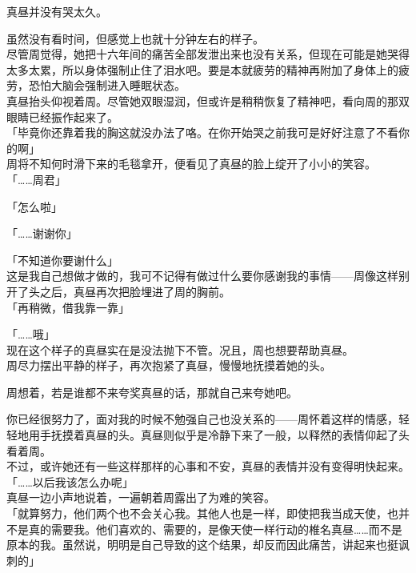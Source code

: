 真昼并没有哭太久。

虽然没有看时间，但感觉上也就十分钟左右的样子。\\

尽管周觉得，她把十六年间的痛苦全部发泄出来也没有关系，但现在可能是她哭得太多太累，所以身体强制止住了泪水吧。要是本就疲劳的精神再附加了身体上的疲劳，恐怕大脑会强制进入睡眠状态。\\

真昼抬头仰视着周。尽管她双眼湿润，但或许是稍稍恢复了精神吧，看向周的那双眼睛已经振作起来了。\\

「毕竟你还靠着我的胸这就没办法了咯。在你开始哭之前我可是好好注意了不看你的啊」\\

周将不知何时滑下来的毛毯拿开，便看见了真昼的脸上绽开了小小的笑容。\\

「……周君」

「怎么啦」

「……谢谢你」

「不知道你要谢什么」\\

这是我自己想做才做的，我可不记得有做过什么要你感谢我的事情——周像这样别开了头之后，真昼再次把脸埋进了周的胸前。\\

「再稍微，借我靠一靠」

「……哦」\\

现在这个样子的真昼实在是没法抛下不管。况且，周也想要帮助真昼。\\

周尽力摆出平静的样子，再次抱紧了真昼，慢慢地抚摸着她的头。

周想着，若是谁都不来夸奖真昼的话，那就自己来夸她吧。

你已经很努力了，面对我的时候不勉强自己也没关系的——周怀着这样的情感，轻轻地用手抚摸着真昼的头。真昼则似乎是冷静下来了一般，以释然的表情仰起了头看着周。\\

不过，或许她还有一些这样那样的心事和不安，真昼的表情并没有变得明快起来。\\

「……以后我该怎么办呢」\\

真昼一边小声地说着，一遍朝着周露出了为难的笑容。\\

「就算努力，他们两个也不会关心我。其他人也是一样，即使把我当成天使，也并不是真的需要我。他们喜欢的、需要的，是像天使一样行动的椎名真昼……而不是原本的我。虽然说，明明是自己导致的这个结果，却反而因此痛苦，讲起来也挺讽刺的」\\

